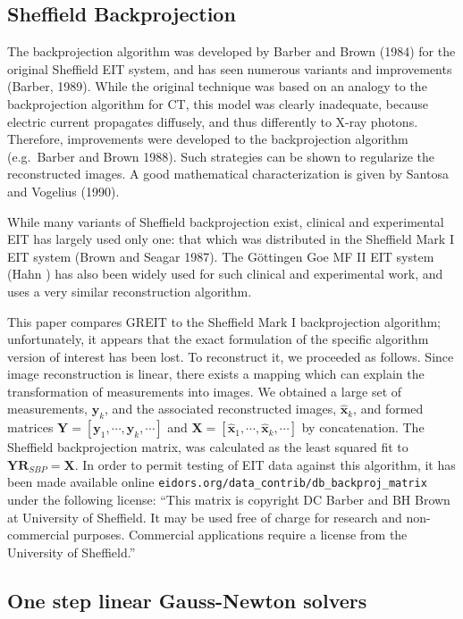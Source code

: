 \documentclass[12pt]{iopart}
\newcommand{\xH}{\mbox{$\mathbf{\hat x}$}}
\newcommand{\yB}{\mbox{$\mathbf{y}$}}
\newcommand{\RB}{\mbox{$\mathbf{R}$}}
\newcommand{\XB}{\mbox{$\mathbf{X}$}}
\newcommand{\YB}{\mbox{$\mathbf{Y}$}}
\begin{document}
\subsection{Sheffield Backprojection}

The backprojection algorithm was developed by 
Barber and Brown (1984) for the original 
Sheffield EIT system, and  has seen numerous 
variants and improvements (Barber, 1989). While the original
technique was based on an analogy to the backprojection
algorithm for CT, this model was clearly inadequate, because
electric current propagates diffusely, and thus differently
to X-ray photons. Therefore, improvements
were developed to the backprojection algorithm
(e.g.\ Barber and Brown 1988). Such strategies
can be shown to regularize the reconstructed images.
A good mathematical characterization is given by
Santosa and Vogelius (1990).

While many variants of Sheffield backprojection exist,
clinical and experimental EIT has largely used only
one: that which was distributed in the
Sheffield Mark I EIT system (Brown and Seagar 1987).
The G\"ottingen Goe MF II EIT system (Hahn )
has also been widely used for such clinical and
experimental work, and uses a very similar reconstruction
algorithm.

This paper compares GREIT to the Sheffield Mark I
backprojection algorithm;
unfortunately, it appears that the exact formulation
of the specific algorithm version of interest has been
lost. To reconstruct it, we proceeded as follows.
Since image reconstruction is linear, there exists
a mapping which can explain the transformation of
measurements into images. We obtained a large set of
measurements, $\yB_k$, and the associated
reconstructed images, $\xH_k$, and formed matrices
$\YB = [ \yB_1, \cdots, \yB_k, \cdots]$ and 
$\XB = [ \xH_1, \cdots, \xH_k, \cdots]$ by concatenation.
The Sheffield backprojection matrix, was
calculated as the least squared fit to
   $\YB \RB_{SBP} = \XB$.
In order to permit testing of EIT data against
this algorithm, it has been made available
online 
\verb$eidors.org/data_contrib/db_backproj_matrix$
under the following license:
``This matrix is copyright DC Barber and BH Brown at
  University of Sheffield. It may be used free of charge
  for research and non-commercial purposes. Commercial
  applications require a license from the University of Sheffield.''


\subsection{One step linear Gauss-Newton solvers}
\label{subsec:OSLGNS}
\end{document}
